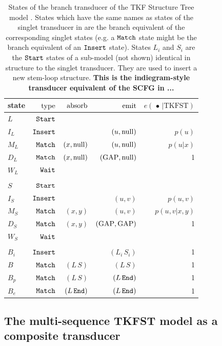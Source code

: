 \documentclass[10pt]{article}
\begin{document}
\begin{table}[!ht]
  \centering
  \begin{tabular}{lrrrr}
    state & $\operatorname{type}$ & $\operatorname{absorb}$ & $\operatorname{emit}$ & $e(\,\bullet\,|\mathrm{TKFST})$ \\ \hline
    $L$ & $\mathtt{Start}$ \\
    $I_L$ & $\mathtt{Insert}$ & & $(u,\mathrm{null})$ & $p(u)$ \\
    $M_L$ & $\mathtt{Match}$ & $(x,\mathrm{null})$ & $(u,\mathrm{null})$ & $p(u|x)$ \\
    $D_L$ & $\mathtt{Match}$ & $(x,\mathrm{null})$ & $(\mathrm{GAP},\mathrm{null})$ & 1 \\
    $W_L$ & $\mathtt{Wait}$ \\
    \\
    $S$ & $\mathtt{Start}$ \\
    $I_S$ & $\mathtt{Insert}$ & & $(u,v)$ & $p(u,v)$ \\
    $M_S$ & $\mathtt{Match}$ & $(x,y)$ & $(u,v)$ & $p(u,v|x,y)$ \\
    $D_S$ & $\mathtt{Match}$ & $(x,y)$ & $(\mathrm{GAP},\mathrm{GAP})$ & 1 \\
    $W_S$ & $\mathtt{Wait}$ \\
    \\
    $B_i$ & $\mathtt{Insert}$ & & $(L_i\,S_i)$ & 1 \\
    $B$ & $\mathtt{Match}$ & $(L\,S)$ & $(L\,S)$ & 1 \\
    $B_p$ & $\mathtt{Match}$ & $(L\,S)$ & $(L\,\mathtt{End})$ & 1 \\
    $B_e$ & $\mathtt{Match}$ & $(L\,\mathtt{End})$ & $(L\,\mathtt{End})$ & 1 \\
  \end{tabular}
  \caption{
    States of the branch transducer of the TKF Structure Tree model \cite{Holmes2004}.
    States which have the same names as states of the singlet transducer in 
    are the branch equivalent of the corresponding singlet states
    (e.g. a $\mathtt{Match}$ state might be the branch equivalent of an $\mathtt{Insert}$ state).
    States $L_i$ and $S_i$ are the $\mathtt{Start}$ states of a sub-model (not shown) identical
    in structure to the singlet transducer.  They are used to insert a new stem-loop structure.
    {\bf This is the indiegram-style transducer equivalent of the SCFG in  ...}
  }
\end{table}




\subsection{The multi-sequence TKFST model as a composite transducer}
\end{document}
